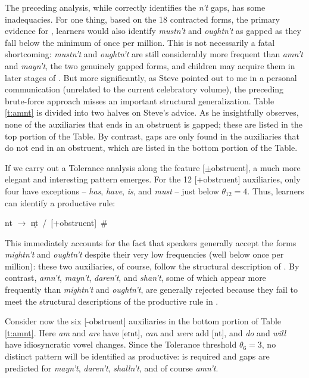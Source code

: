 \documentclass[output=paper,
modfonts
]{LSP/langsci}
\begin{document}
The preceding analysis, while correctly identifies the \textit{n't} gaps,
has some inadequacies.  For one thing, based on the 18 contracted
forms, the primary evidence for , learners would
also identify \textit{mustn't} and \textit{oughtn't} as gapped as they fall
below the minimum  of once per million. 
This is not necessarily a fatal shortcoming: 
\textit{mustn't} and \textit{oughtn't} are still 
considerably more frequent than \textit{amn't} and \textit{mayn't}, the two
genuinely  gapped forms, and children may acquire them in later stages of
.  But more significantly, as Steve pointed out 
to me in a personal communication (unrelated to the current
celebratory volume), the preceding brute-force approach 
misses an important structural generalization. Table
\ref{t:amnt} is divided into two halves on Steve's advice.  As he
insightfully observes,  none of the auxiliaries that ends in an
obstruent is gapped; these are listed in the top portion of the
Table. By contrast, gaps are only found in the 
auxiliaries that do not end in an obstruent, which are listed in the bottom
portion of the Table. 

If we carry out a Tolerance analysis along the feature
[$\pm$obstruent], a much more elegant and interesting pattern
emerges. For the 12 [+obstruent] auxiliaries, only four have
exceptions -- \textit{has}, \textit{have}, \textit{  is}, and \textit{must} -- just below $\theta_{12}=4$. Thus,  learners can
identify a productive rule:  

\begin{exe} \ex \label{nt-rule}

nt $\longrightarrow$
n̩t~/~[+obstruent]~\#~\underline{\hspace{0.5cm}} \end{exe}

\noindent This immediately accounts for the  fact that speakers generally
accept the forms \textit{mightn't} and \textit{oughtn't} despite their very low
frequencies (well below once per million): these two
auxiliaries, of course, follow the structural description of
. By contrast, \textit{amn't}, \textit{mayn't}, 
\textit{daren't}, and \textit{shan't}, some of which 
appear more frequently than \textit{mightn't} and \textit{oughtn't}, are
generally rejected because they fail to meet the structural
descriptions of the productive rule in . 

Consider now the six  [-obstruent] auxiliaries in the bottom portion of Table
\ref{t:amnt}. Here  \textit{am} and \textit{are} have [eɪnt],
\textit{can} and \textit{were} add [nt], and \textit{do} and \textit{will} have
idiosyncratic vowel changes. Since the Tolerance threshold $\theta_6 =
3$, no distinct pattern will  be identified as productive:
 is required 
and gaps are predicted for \textit{mayn't}, \textit{daren't}, \textit{shalln't}, and of
course \textit{amn't}.  
\end{document}
